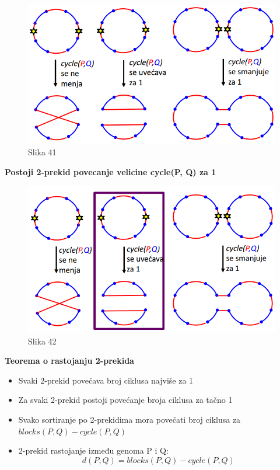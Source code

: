 \documentclass{article}
\begin{document}
\begin{figure}[h!]
\centering
\includegraphics[scale=0.5]{slike/izmena2prekidima.PNG}
\caption{Slika 41}
\label{slika:X}
\end{figure}
\newpage
\noindent \textbf{Postoji 2-prekid povecanje velicine cycle(P, Q) za 1}
\begin{figure}[h]
\centering
\includegraphics[scale=0.6]{slike/izmena2prekidima2.PNG}
\caption{Slika 42}
\label{slika:X}
\end{figure}

\noindent \textbf{Teorema o rastojanju 2-prekida}
\begin{itemize}
    \item Svaki 2-prekid povećava broj ciklusa najviše za 1
    \item Za svaki 2-prekid postoji povećanje broja ciklusa za tačno 1
    \item Svako sortiranje po 2-prekidima mora povećati broj ciklusa za $blocks(P,Q) - cycle(P, Q)$
    \item 2-prekid rastojanje između genoma P i Q:   $$d(P,Q) = blocks(P, Q) - cycle(P,Q)$$
\end{itemize}
\end{document}
